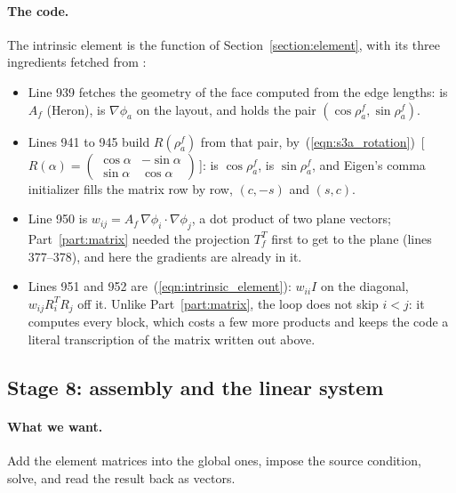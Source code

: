 \paragraph{The code.} The intrinsic element is the function  of Section~\ref{section:element}, with its three ingredients fetched from :

\begin{itemize}
\item Line 939 fetches the geometry of the face computed from the edge lengths:  is $A_f$ (Heron),  is $\nabla\phi_a$ on the layout, and  holds the pair $(\cos\rho_a^f, \sin\rho_a^f)$.
\item Lines 941 to 945 build $R(\rho_a^f)$ from that pair, by~(\ref{eqn:s3a_rotation})~[\,$R(\alpha) = \left(\begin{smallmatrix} \cos\alpha & -\sin\alpha \\ \sin\alpha & \cos\alpha\end{smallmatrix}\right)$\,]:  is $\cos\rho_a^f$,  is $\sin\rho_a^f$, and Eigen's comma initializer fills the matrix row by row, $(c, -s)$ and $(s, c)$.
\item Line 950 is $w_{ij} = A_f\,\nabla\phi_i\cdot\nabla\phi_j$, a dot product of two plane vectors; Part~\ref{part:matrix} needed the projection $T_f^T$ first to get to the plane (lines 377--378), and here the gradients are already in it.
\item Lines 951 and 952 are~(\ref{eqn:intrinsic_element}): $w_{ii}I$ on the diagonal, $w_{ij}R_i^TR_j$ off it. Unlike Part~\ref{part:matrix}, the loop does not skip $i < j$: it computes every block, which costs a few more products and keeps the code a literal transcription of the matrix written out above.
\end{itemize}

\subsection{Stage 8: assembly and the linear system}
\label{section:r3_stage8}

\paragraph{What we want.} Add the element matrices into the global ones, impose the source condition, solve, and read the result back as vectors.

